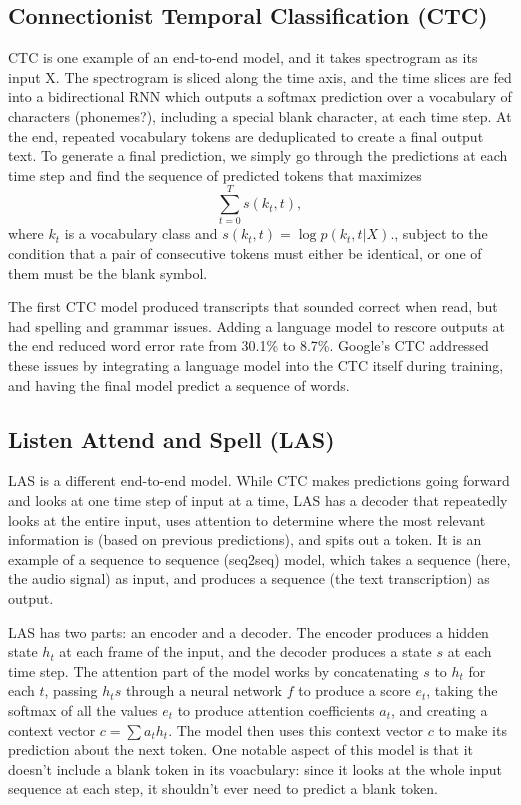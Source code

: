 \subsection{Connectionist Temporal Classification (CTC)}

CTC is one example of an end-to-end model, and it takes spectrogram as its input X. The spectrogram is sliced along the time axis, and the time slices are fed into a bidirectional RNN which outputs a softmax prediction over a vocabulary of characters (phonemes?), including a special blank character, at each time step. At the end, repeated vocabulary tokens are deduplicated to create a final output text. To generate a final prediction, we simply go through the predictions at each time step and find the sequence of predicted tokens that maximizes
$$\sum_{t=0}^T s(k_t, t),$$
where $k_t$ is a vocabulary class and $s(k_t, t) = \log p(k_t, t| X).$, subject to the condition that a pair of consecutive tokens must either be identical, or one of them must be the blank symbol.

The first CTC model produced transcripts that sounded correct when read, but had spelling and grammar issues. Adding a language model to rescore outputs at the end reduced word error rate from 30.1\% to 8.7\%. Google's CTC addressed these issues by integrating a language model into the CTC itself during training, and having the final model predict a sequence of words.

\subsection{Listen Attend and Spell (LAS)}

LAS is a different end-to-end model. While CTC makes predictions going forward and looks at one time step of input at a time, LAS has a decoder that repeatedly looks at the entire input, uses attention to determine where the most relevant information is (based on previous predictions), and spits out a token. It is an example of a sequence to sequence (seq2seq) model, which takes a sequence (here, the audio signal) as input, and produces a sequence (the text transcription) as output.

LAS has two parts: an encoder and a decoder. The encoder produces a hidden state $h_t$ at each frame of the input, and the decoder produces a state $s$ at each time step. The attention part of the model works by concatenating $s$ to $h_t$ for each $t$, passing $h_ts$ through a neural network $f$ to produce a score $e_t$, taking the softmax of all the values $e_t$ to produce attention coefficients $a_t$, and creating a context vector $c = \sum a_t h_t$. The model then uses this context vector $c$ to make its prediction about the next token. One notable aspect of this model is that it doesn't include a blank token in its voacbulary: since it looks at the whole input sequence at each step, it shouldn't ever need to predict a blank token.

